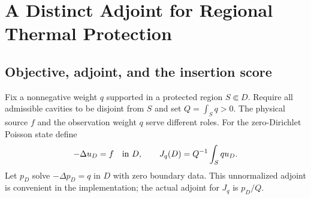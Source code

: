 \section{A Distinct Adjoint for Regional Thermal Protection}
\label{app:regional}

\subsection{Objective, adjoint, and the insertion score}
Fix a nonnegative weight $q$ supported in a protected region $S\Subset D$.
Require all admissible cavities to be disjoint from $S$ and set
$Q=\int_S q>0$. The physical source $f$ and the observation weight $q$
serve different roles. For the zero-Dirichlet Poisson state define
\begin{equation}
 -\Delta u_D=f\quad\hbox{in }D,\qquad
 J_q(D)=Q^{-1}\int_S q u_D.
 \label{eq:regionalobjective}
\end{equation}
Let $p_D$ solve $-\Delta p_D=q$ in $D$ with zero boundary data. This
unnormalized adjoint is convenient in the implementation; the actual
adjoint for $J_q$ is $p_D/Q$.

